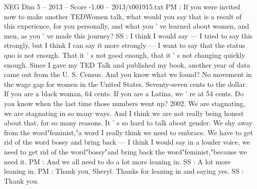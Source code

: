 \begin{textsample}{NEG Dim 5 – 2013 – Score -1.00 – 2013/t001915.txt}
PM : If you were invited now to make another TEDWomen talk, what would you say that is a result of this experience, for you personally, and what you ' ve learned about women, and men, as you ' ve made this journey?
SS : I think I would say — I tried to say this strongly, but I think I can say it more strongly — I want to say that the status quo is not enough.
That it ' s not good enough, that it ' s not changing quickly enough.
Since I gave my TED Talk and published my book, another year of data came out from the U.
S.
Census.
And you know what we found?
No movement in the wage gap for women in the United States.
Seventy-seven cents to the dollar.
If you are a black woman, 64 cents.
If you are a Latina, we ' re at 54 cents.
Do you know when the last time those numbers went up? 2002.
We are stagnating, we are stagnating in so many ways.
And I think we are not really being honest about that, for so many reasons.
It ' s so hard to talk about gender.
We shy away from the word"feminist,"a word I really think we need to embrace.
We have to get rid of the word bossy and bring back — I think I would say in a louder voice, we need to get rid of the word"bossy"and bring back the word"feminist,"because we need it.
PM : And we all need to do a lot more leaning in.
SS : A lot more leaning in.
PM : Thank you, Sheryl.
Thanks for leaning in and saying yes.
SS : Thank you.

\end{textsample}
